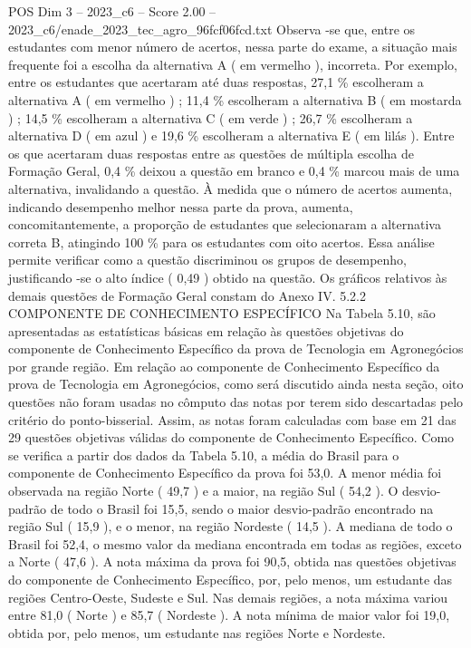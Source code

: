 \begin{textsample}{POS Dim 3 – 2023\_c6 – Score 2.00 – 2023\_c6/enade\_2023\_tec\_agro\_96fcf06fcd.txt}
Observa -se que, entre os estudantes com menor número de acertos, nessa parte do exame, a situação mais frequente foi a escolha da alternativa A ( em vermelho ), incorreta.
Por exemplo, entre os estudantes que acertaram até duas respostas, 27,1 \% escolheram a alternativa A ( em vermelho ) ; 11,4 \% escolheram a alternativa B ( em mostarda ) ; 14,5 \% escolheram a alternativa C ( em verde ) ; 26,7 \% escolheram a alternativa D ( em azul ) e 19,6 \% escolheram a alternativa E ( em lilás ).
Entre os que acertaram duas respostas entre as questões de múltipla escolha de Formação Geral, 0,4 \% deixou a questão em branco e 0,4 \% marcou mais de uma alternativa, invalidando a questão.
À medida que o número de acertos aumenta, indicando desempenho melhor nessa parte da prova, aumenta, concomitantemente, a proporção de estudantes que selecionaram a alternativa correta B, atingindo 100 \% para os estudantes com oito acertos.
Essa análise permite verificar como a questão discriminou os grupos de desempenho, justificando -se o alto índice ( 0,49 ) obtido na questão.
Os gráficos relativos às demais questões de Formação Geral constam do Anexo IV. 5.2.2 COMPONENTE DE CONHECIMENTO ESPECÍFICO Na Tabela 5.10, são apresentadas as estatísticas básicas em relação às questões objetivas do componente de Conhecimento Específico da prova de Tecnologia em Agronegócios por grande região.
Em relação ao componente de Conhecimento Específico da prova de Tecnologia em Agronegócios, como será discutido ainda nesta seção, oito questões não foram usadas no cômputo das notas por terem sido descartadas pelo critério do ponto-bisserial.
Assim, as notas foram calculadas com base em 21 das 29 questões objetivas válidas do componente de Conhecimento Específico.
Como se verifica a partir dos dados da Tabela 5.10, a média do Brasil para o componente de Conhecimento Específico da prova foi 53,0.
A menor média foi observada na região Norte ( 49,7 ) e a maior, na região Sul ( 54,2 ).
O desvio-padrão de todo o Brasil foi 15,5, sendo o maior desvio-padrão encontrado na região Sul ( 15,9 ), e o menor, na região Nordeste ( 14,5 ).
A mediana de todo o Brasil foi 52,4, o mesmo valor da mediana encontrada em todas as regiões, exceto a Norte ( 47,6 ).
A nota máxima da prova foi 90,5, obtida nas questões objetivas do componente de Conhecimento Específico, por, pelo menos, um estudante das regiões Centro-Oeste, Sudeste e Sul.
Nas demais regiões, a nota máxima variou entre 81,0 ( Norte ) e 85,7 ( Nordeste ).
A nota mínima de maior valor foi 19,0, obtida por, pelo menos, um estudante nas regiões Norte e Nordeste.

\end{textsample}
